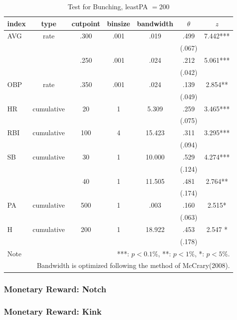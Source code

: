 \documentclass[dvipdfmx,12pt]{beamer}
\begin{document}
\begin{frame}
  \begin{table}
    \tiny
    \centering
    \caption{Test for Bunching, leastPA $= 200$}
    \begin{tabular}{lcccccc}\hline
      index & type & cutpoint & binsize & bandwidth & $\theta$ & $z$
      \\ \hline \hline
      AVG & rate & .300 & .001 & .019 &  .499 & 7.442*** \\
      & & & & & (.067) & \\
      & & .250 & .001 & .024 & .212 & 5.061*** \\
      & & & & & (.042) & \\
      OBP & rate & .350 & .001 & .024 &  .139 & 2.854** \\
      & & & & & (.049) &  \\
      HR & cumulative & 20 & 1 & 5.309 & .259 & 3.465*** \\
      & & & & & (.075)  & \\
      RBI & cumulative & 100 & 4 & 15.423 & .311 & 3.295*** \\
      & & & & & (.094) & \\
      SB & cumulative & 30 & 1 & 10.000 & .529 & 4.274*** \\
      & & & & & (.124) & \\
      & & 40 & 1 & 11.505 & .481 & 2.764** \\
      & & & & & (.174) & \\
      PA & cumulative & 500 & 1 & .003 & .160 & 2.515* \\
      & & & & &(.063) & \\
      H & cumulative & 200 & 1 & 18.922 & .453 & 2.547 * \\
      & & & & & (.178) & \\ \hline \hline
      Note & \multicolumn{6}{r}{
      ***: $p<0.1\%$, **: $p<1\%$, *: $p<5\%$.
      }\\
      \multicolumn{7}{r}{
      Bandwidth is optimized following the method of McCrary(2008).
      }
    \end{tabular}
    \label{Bunch-True}
  \end{table}
\end{frame}

\begin{frame}\frametitle{Monetary Reward: Notch}
\end{frame}

\begin{frame}\frametitle{Monetary Reward: Kink}

\end{frame}
\end{document}
